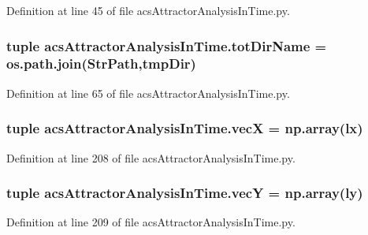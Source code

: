 Definition at line 45 of file acs\-Attractor\-Analysis\-In\-Time.\-py.

\hypertarget{a00092_aeed4ca0c266fb5e31aebbbbe2f389378}{
\subsubsection[{tot\-Dir\-Name}]{\setlength{\rightskip}{0pt plus 5cm}tuple acs\-Attractor\-Analysis\-In\-Time.\-tot\-Dir\-Name = os.\-path.\-join({\bf Str\-Path},tmp\-Dir)}}\label{a00092_aeed4ca0c266fb5e31aebbbbe2f389378}


Definition at line 65 of file acs\-Attractor\-Analysis\-In\-Time.\-py.

\hypertarget{a00092_a55e7171c96f320a08ad29f21ad5faf9a}{
\subsubsection[{vec\-X}]{\setlength{\rightskip}{0pt plus 5cm}tuple acs\-Attractor\-Analysis\-In\-Time.\-vec\-X = np.\-array(lx)}}\label{a00092_a55e7171c96f320a08ad29f21ad5faf9a}


Definition at line 208 of file acs\-Attractor\-Analysis\-In\-Time.\-py.

\hypertarget{a00092_aaa4ad55a8fe44bfc5a386dff027886b0}{
\subsubsection[{vec\-Y}]{\setlength{\rightskip}{0pt plus 5cm}tuple acs\-Attractor\-Analysis\-In\-Time.\-vec\-Y = np.\-array(ly)}}\label{a00092_aaa4ad55a8fe44bfc5a386dff027886b0}


Definition at line 209 of file acs\-Attractor\-Analysis\-In\-Time.\-py.

